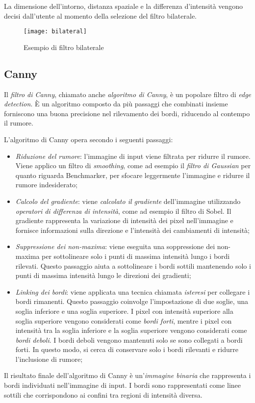 La dimensione dell'intorno, distanza spaziale e la differenza d'intensità vengono decisi dall'utente al momento della selezione del filtro bilaterale.

\begin{figure}[H]
	\centering
	\texttt{[image: bilateral]}
	\caption{Esempio di filtro bilaterale}
\end{figure}

\subsection{Canny}
Il \textit{filtro di Canny}, chiamato anche \textit{algoritmo di Canny}, è un popolare filtro di \textit{edge detection}. È un algoritmo composto da più passaggi che combinati insieme forniscono una buona precisione nel rilevamento dei bordi, riducendo al contempo il rumore.

L'algoritmo di Canny opera secondo i seguenti passaggi:
\begin{itemize}
	\item \textit{Riduzione del rumore}: l'immagine di input viene filtrata per ridurre il rumore. Viene applico un filtro di \textit{smoothing}, come ad esempio il \textit{filtro di Gaussian} per quanto riguarda Benchmarker, per sfocare leggermente l'immagine e ridurre il rumore indesiderato;
	
	\item \textit{Calcolo del gradiente}: viene \textit{calcolato il gradiente} dell'immagine utilizzando\textit{ operatori di differenza di intensità}, come ad esempio il filtro di Sobel. Il gradiente rappresenta la variazione di intensità dei pixel nell'immagine e fornisce informazioni sulla direzione e l'intensità dei cambiamenti di intensità;
	
	\item \textit{Suppressione dei non-maxima}: viene eseguita una soppressione dei non-maxima per sottolineare solo i punti di massima intensità lungo i bordi rilevati. Questo passaggio aiuta a sottolineare i bordi sottili mantenendo solo i punti di massima intensità lungo le direzioni dei gradienti;
	
	\item \textit{Linking dei bordi}: viene applicata una tecnica chiamata \textit{isteresi} per collegare i bordi rimanenti. Questo passaggio coinvolge l'impostazione di due soglie, una soglia inferiore e una soglia superiore. I pixel con intensità superiore alla soglia superiore vengono considerati come \textit{bordi forti}, mentre i pixel con intensità tra la soglia inferiore e la soglia superiore vengono considerati come \textit{bordi deboli}. I bordi deboli vengono mantenuti solo se sono collegati a bordi forti. In questo modo, si cerca di conservare solo i bordi rilevanti e ridurre l'inclusione di rumore;
\end{itemize}
\noindent Il risultato finale dell'algoritmo di Canny è un'\textit{immagine binaria} che rappresenta i bordi individuati nell'immagine di input. I bordi sono rappresentati come linee sottili che corrispondono ai confini tra regioni di intensità diversa.

